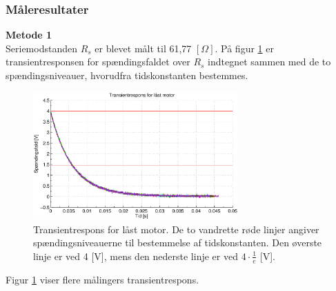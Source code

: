 \subsubsection{Måleresultater}
\textbf{Metode 1}\\
Seriemodstanden \(R_s\) er blevet målt til 61,77 \([\Omega]\).
På figur \ref{fig:induktans0} er transientresponsen for spændingsfaldet over \(R_s\) indtegnet
sammen med de to spændingsniveauer, hvorudfra tidskonstanten bestemmes.
\begin{figure}[th!]
	\centering
	\includegraphics[width=0.7\textwidth]{./graphics/induktans0.eps}
	\captionsetup{width=0.7\textwidth}
	\caption[Transientrespons for låst motor]
		{Transientrespons for låst motor. De to vandrette røde linjer angiver spændingsniveauerne til bestemmelse af tidskonstanten.
		Den øverste linje er ved 4 [V], mens den nederste linje er ved \(4\cdot \frac{1}{e}\)  [V].}
	\label{fig:induktans0}
\end{figure}
Figur \ref{fig:induktans0} viser flere målingers transientrespons.

